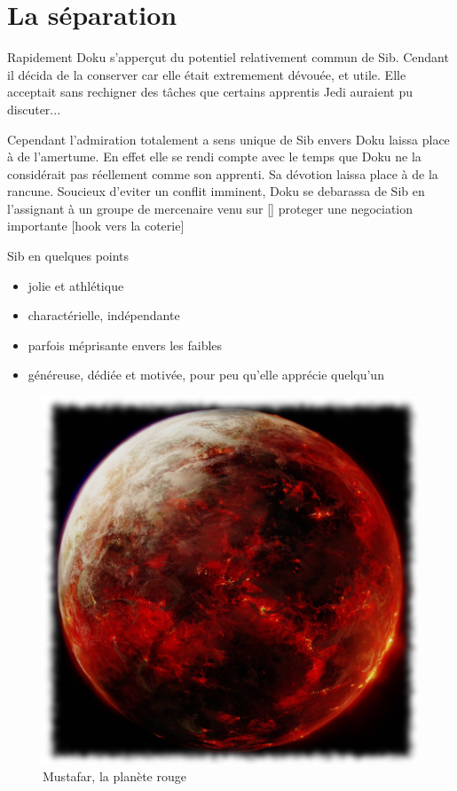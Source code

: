 \documentclass[10pt,a4paper,twoside,twocolumn,openany]{book}
\begin{document}
\section{La séparation}
Rapidement Doku s'apperçut du potentiel relativement commun de Sib. Cendant il décida de la conserver car elle était extremement dévouée, et utile. Elle acceptait sans rechigner des tâches que certains apprentis Jedi auraient pu discuter...

Cependant l'admiration totalement a sens unique de Sib envers Doku laissa
place à de l'amertume. En effet elle se rendi compte avec le temps que Doku
 ne la considérait pas réellement comme son apprenti.
Sa dévotion laissa place à de la rancune. Soucieux d'eviter un conflit imminent, Doku se debarassa de Sib en
l'assignant à un groupe de mercenaire venu sur [] proteger une negociation importante [hook vers la coterie]

\begin{commentbox}{Sib en quelques points}

\begin{itemize}
\item jolie et athlétique
\item charactérielle, indépendante
\item parfois méprisante envers les faibles
\item généreuse, dédiée et motivée, pour peu qu'elle apprécie quelqu'un
\end{itemize}

\end{commentbox}

\vspace{2cm}

\begin{figure}
\centering
\includegraphics[scale=0.4]{mustafar.png}
\caption*{\color{white}Mustafar, la planète rouge}
\end{figure}
\end{document}
